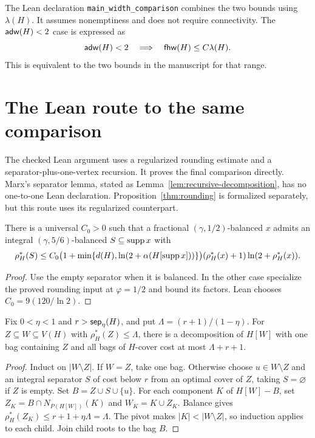 The Lean declaration \texttt{main\_width\_comparison} combines the two
bounds using $\lambda(H)$. It assumes nonemptiness and does not require
connectivity. The $\mathsf{adw}(H)<2$ case is expressed as
\[
 \mathsf{adw}(H)<2\quad\Longrightarrow\quad\mathsf{fhw}(H)\le C\lambda(H).
\]
This is equivalent to the two bounds in the manuscript for that range.

\section{The Lean route to the same comparison}
\label{sec:lean-route}

The checked Lean argument uses a regularized rounding estimate and a
separator-plus-one-vertex recursion. It proves the final comparison directly.
Marx's separator lemma, stated as Lemma~\ref{lem:recursive-decomposition},
has no one-to-one Lean declaration. Proposition~\ref{thm:rounding} is
formalized separately, but this route uses its regularized counterpart.

\begin{lemma}
\label{lem:regularized-rounding}
\leanok
There is a universal $C_0>0$ such that a fractional
$(\gamma,1/2)$-balanced $x$ admits an integral $(\gamma,5/6)$-balanced
$S\subseteq\operatorname{supp} x$ with
\[
 \rho_H^*(S)\le C_0
 \bigl(1+\min\{d(H),\ln(2+\alpha(H[\operatorname{supp} x]))\}\bigr)
 (\rho_H^*(x)+1)\ln(2+\rho_H^*(x)).
\]
\end{lemma}
\begin{proof}\leanok
Use the empty separator when it is balanced. In the other case specialize
the proved rounding input at $\varphi=1/2$ and bound its factors. Lean
chooses $C_0=9(120/\ln2)$.
\end{proof}

\begin{lemma}
\label{lem:rooted-invariant}
\leanok
Fix $0<\eta<1$ and $r>\mathsf{sep}_\eta(H)$, and put
$\Lambda=(r+1)/(1-\eta)$. For $Z\subseteq W\subseteq V(H)$ with
$\rho_H^*(Z)\le\Lambda$, there is a decomposition of $H[W]$ with one bag
containing $Z$ and all bags of $H$-cover cost at most $\Lambda+r+1$.
\end{lemma}
\begin{proof}\leanok
Induct on $|W\setminus Z|$. If $W=Z$, take one bag. Otherwise choose
$u\in W\setminus Z$ and an integral separator $S$ of cost below $r$
from an optimal cover of $Z$, taking $S=\varnothing$ if $Z$ is empty.
Set $B=Z\cup S\cup\{u\}$. For each component $K$ of $H[W]-B$, set
$Z_K=B\cap N_{P(H[W])}(K)$ and $W_K=K\cup Z_K$. Balance gives
$\rho_H^*(Z_K)\le r+1+\eta\Lambda=\Lambda$.
The pivot makes $|K|<|W\setminus Z|$, so induction applies to each child.
Join child roots to the bag $B$.
\end{proof}

